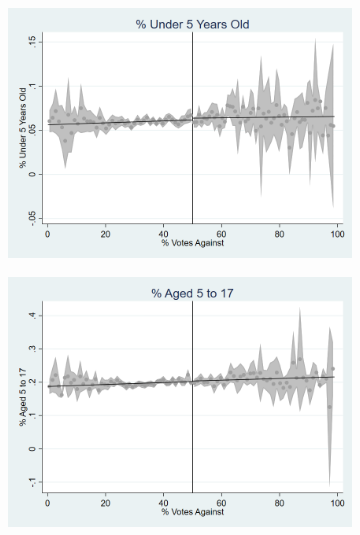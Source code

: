 \begin{figure}[ht]
    \vspace{1em}

    \begin{minipage}[b]{0.48\textwidth}
        \centering
        \begin{subfigure}[b]{\textwidth}
            \centering
            \includegraphics[width=\textwidth,keepaspectratio]{images/cov_smoothness_pctlt5.png}
            \label{fig:pctlt5_sm}
        \end{subfigure}
    \end{minipage}
    \hfill
    \begin{minipage}[b]{0.48\textwidth}
        \centering
        \begin{subfigure}[b]{\textwidth}
            \centering
            \includegraphics[width=\textwidth,keepaspectratio]{images/cov_smoothness_pct5to17.png}
            \label{fig:pct5to17_sm}
        \end{subfigure}
    \end{minipage}    


\end{figure}
